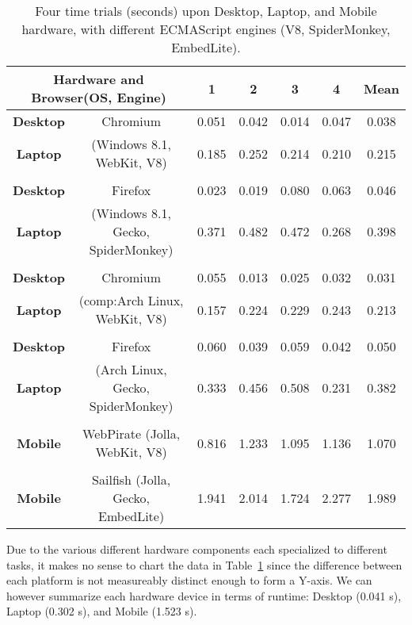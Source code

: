 \begin{table}[h]
\begin{center}
\begin{tabular}{| c c | c c c c | c |}\hline
   \multicolumn{2}{|c|}{\textbf{Hardware and Browser(OS, Engine)}}  & \textbf{1}  & \textbf{2} & \textbf{3} & \textbf{4} & \textbf{Mean}   \\\hline
\textbf{Desktop}  & Chromium  & 0.051      & 0.042      & 0.014      & 0.047      & 0.038           \\
\textbf{Laptop}   &  (Windows 8.1, WebKit, V8)   & 0.185      & 0.252      & 0.214      & 0.210      & 0.215           \\
 & & & & & & \\
\textbf{Desktop} &  Firefox   & 0.023      & 0.019      & 0.080      & 0.063      & 0.046          \\
\textbf{Laptop}  &  (Windows 8.1, Gecko, SpiderMonkey)  & 0.371      & 0.482      & 0.472      & 0.268      & 0.398          \\
 & & & & & & \\
\textbf{Desktop} & Chromium  & 0.055      & 0.013      & 0.025      & 0.032      & 0.031           \\
\textbf{Laptop} & (\gls{comp:Arch} Linux, WebKit, V8) & 0.157 & 0.224 & 0.229 & 0.243 & 0.213 \\
 & & & & & & \\
\textbf{Desktop} & Firefox   & 0.060      & 0.039      & 0.059      & 0.042      & 0.050          \\
\textbf{Laptop}  & (Arch Linux, Gecko, SpiderMonkey)   & 0.333      & 0.456      & 0.508      & 0.231      & 0.382          \\
 & & & & & & \\
\textbf{Mobile}  & WebPirate (Jolla, WebKit, V8) & 0.816      & 1.233      & 1.095      & 1.136      & 1.070        \\
 & & & & & & \\
\textbf{Mobile}  & Sailfish (Jolla, Gecko, EmbedLite) & 1.941      & 2.014      & 1.724      & 2.277      & 1.989       \\
\hline
\end{tabular}
\end{center}
\vspace{-15pt}
\caption[HaploHTML5 A* Performance Table]{Four time trials (seconds) upon Desktop, Laptop, and Mobile hardware, with different ECMAScript engines (V8, SpiderMonkey, EmbedLite).}\label{table:res:haploastarperf}
\end{table}


Due to the various different hardware components each specialized to different tasks, it makes no sense to chart the data in Table~\ref{table:res:haploastarperf} since the difference between each platform is not measureably distinct enough to form a Y-axis. We can however summarize each hardware device in terms of runtime: Desktop (0.041 s), Laptop (0.302 s), and Mobile (1.523 s).







